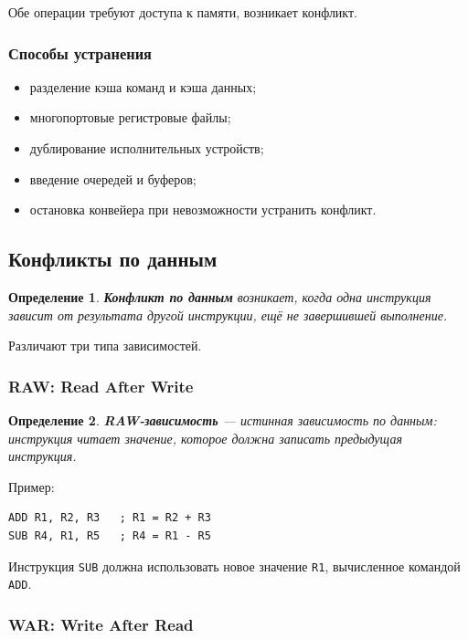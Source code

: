 \documentclass[12pt,a4paper]{article}
\newtheorem{definition}{Определение}
\begin{document}
Обе операции требуют доступа к памяти, возникает конфликт.

\subsubsection{Способы устранения}

\begin{itemize}
    \item разделение кэша команд и кэша данных;
    \item многопортовые регистровые файлы;
    \item дублирование исполнительных устройств;
    \item введение очередей и буферов;
    \item остановка конвейера при невозможности устранить конфликт.
\end{itemize}

\subsection{Конфликты по данным}

\begin{definition}
\textbf{Конфликт по данным} возникает, когда одна инструкция зависит от результата другой инструкции, ещё не завершившей выполнение.
\end{definition}

Различают три типа зависимостей.

\subsubsection{RAW: Read After Write}

\begin{definition}
\textbf{RAW-зависимость} --- истинная зависимость по данным: инструкция читает значение, которое должна записать предыдущая инструкция.
\end{definition}

Пример:

\begin{lstlisting}
ADD R1, R2, R3   ; R1 = R2 + R3
SUB R4, R1, R5   ; R4 = R1 - R5
\end{lstlisting}

Инструкция \texttt{SUB} должна использовать новое значение \texttt{R1}, вычисленное командой \texttt{ADD}.

\subsubsection{WAR: Write After Read}
\end{document}
